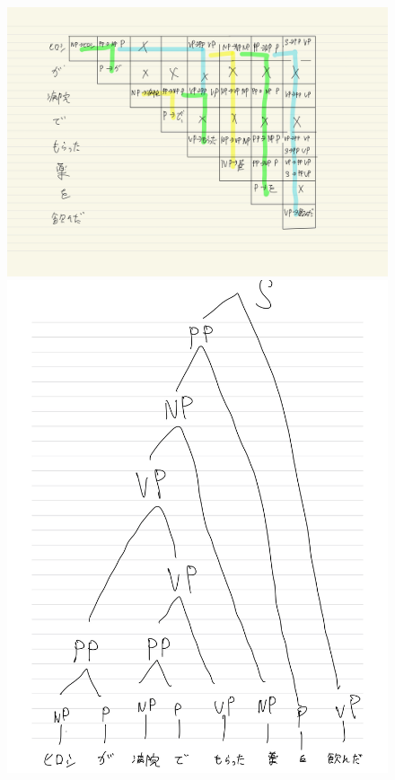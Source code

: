 \documentclass[dvipdfmx,autodetect-engine,titlepage]{jsarticle}
\begin{document}
\begin{figure}[h]
  \centering
  \begin{minipage}[b]{0.45\linewidth}
  \begin{center}
    \includegraphics[keepaspectratio,scale=0.08]{pic3.jpg}
    \end{center}
    \caption{}
  \end{minipage}
  \begin{minipage}[b]{0.45\linewidth}
  \begin{center}
    \includegraphics[keepaspectratio,scale=0.08]{pic4.jpg}
    \end{center}
    \caption{}
  \end{minipage}
\end{figure}
\newpage
\end{document}

